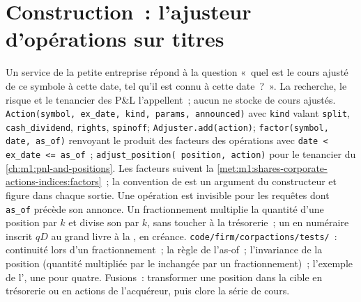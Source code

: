 \section{Construction~: l'ajusteur d'opérations sur titres}\label{bld:m1:shares-corporate-actions-indices:adjuster}

\begin{build}
 Un service de la petite entreprise répond à la question «~quel est le cours ajusté de ce
symbole à cette date, tel qu'il est connu à cette date~?~».
La recherche, le risque et le tenancier des P\&L l'appellent~; aucun ne stocke de cours
ajustés.  \texttt{Action(symbol, ex\_date, kind, params,
announced)} avec \texttt{kind} valant \texttt{split}, \texttt{cash\_dividend},
\texttt{rights}, \texttt{spinoff}; \texttt{Adjuster.add(action)};
\texttt{factor(symbol, date, as\_of)} renvoyant le produit des facteurs des
opérations avec \texttt{date < ex\_date <= as\_of}~; \texttt{adjust\_position(
position, action)} pour le tenancier du \cref{ch:m1:pnl-and-positions}.
 Les facteurs suivent
la \cref{met:m1:shares-corporate-actions-indices:factors}~; la convention de 
est un argument du constructeur et figure dans chaque sortie. Une
opération est invisible pour les requêtes dont \texttt{as\_of} précède son annonce.
Un fractionnement multiplie la quantité d'une position par $k$ et divise son
 par $k$, sans toucher à la trésorerie~; un  en numéraire
inscrit $qD$ au grand livre à la , en créance.
 \texttt{code/firm/corpactions/tests/}~: continuité
lors d'un fractionnement~; la règle de l'as-of~; l'invariance de la position (quantité
multipliée par le  inchangée par un fractionnement)~; l'exemple de l', une pour quatre.
 Fusions~: transformer une position dans la cible en trésorerie ou en
actions de l'acquéreur, puis clore la série de cours.
\end{build}

